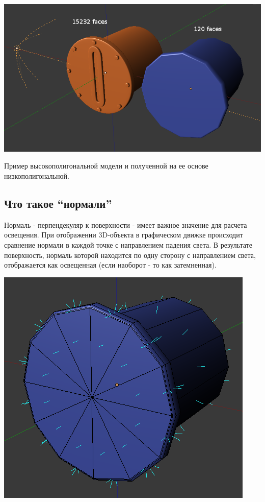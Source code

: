 \documentclass[a4paper,12pt,oneside]{sphinxmanual}
\begin{document}
{\hfill\includegraphics[width=1.000\linewidth]{normals_1.png}\hfill}

Пример высокополигональной модели и полученной на ее основе низкополигональной.


\subsection{Что такое ``нормали''}
\label{assets_creation:id3}
Нормаль - перпендекуляр к поверхности - имеет важное значение для расчета освещения. При отображении 3D-объекта в графическом движке происходит сравнение нормали в каждой точке с направлением падения света. В результате поверхность, нормаль которой находится по одну сторону с направлением света, отображается как освещенная (если наоборот - то как затемненная).

{\hfill\includegraphics[width=1.000\linewidth]{normals_2.png}\hfill}
\end{document}
